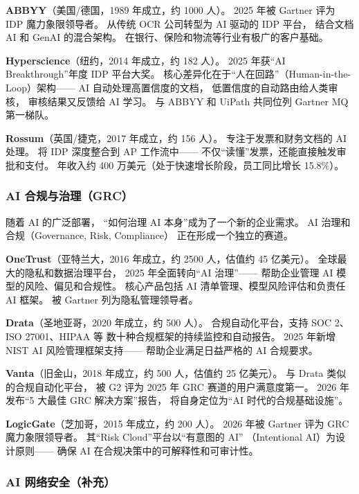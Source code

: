 \textbf{ABBYY}（美国/德国，1989 年成立，约 1000 人）。
2025 年被 Gartner 评为 IDP 魔力象限领导者。
从传统 OCR 公司转型为 AI 驱动的 IDP 平台，
结合文档 AI 和 GenAI 的混合架构。
在银行、保险和物流等行业有极广的客户基础。

\textbf{Hyperscience}（纽约，2014 年成立，约 182 人）。
2025 年获``AI Breakthrough''年度 IDP 平台大奖。
核心差异化在于``人在回路''（Human-in-the-Loop）架构——
AI 自动处理高置信度的文档，
低置信度的自动路由给人类审核，
审核结果又反馈给 AI 学习。
与 ABBYY 和 UiPath 共同位列 Gartner MQ 第一梯队。

\textbf{Rossum}（英国/捷克，2017 年成立，约 156 人）。
专注于发票和财务文档的 AI 处理。
将 IDP 深度整合到 AP 工作流中——
不仅``读懂''发票，还能直接触发审批和支付。
年收入约 400 万美元（处于快速增长阶段，员工同比增长 15.8\%）。

\subsubsection{AI 合规与治理（GRC）}

随着 AI 的广泛部署，
``如何治理 AI 本身''成为了一个新的企业需求。
AI 治理和合规（Governance, Risk, Compliance）
正在形成一个独立的赛道。

\textbf{OneTrust}（亚特兰大，2016 年成立，约 2500 人，估值约 45 亿美元）。
全球最大的隐私和数据治理平台，
2025 年全面转向``AI 治理''——
帮助企业管理 AI 模型的风险、偏见和合规性。
核心产品包括 AI 清单管理、模型风险评估和负责任 AI 框架。
被 Gartner 列为隐私管理领导者。

\textbf{Drata}（圣地亚哥，2020 年成立，约 500 人）。
合规自动化平台，支持 SOC 2、ISO 27001、HIPAA 等
数十种合规框架的持续监控和自动报告。
2025 年新增 NIST AI 风险管理框架支持——
帮助企业满足日益严格的 AI 合规要求。

\textbf{Vanta}（旧金山，2018 年成立，约 500 人，估值约 25 亿美元）。
与 Drata 类似的合规自动化平台，
被 G2 评为 2025 年 GRC 赛道的用户满意度第一。
2026 年发布``5 大最佳 GRC 解决方案''报告，
将自身定位为``AI 时代的合规基础设施''。

\textbf{LogicGate}（芝加哥，2015 年成立，约 200 人）。
2026 年被 Gartner 评为 GRC 魔力象限领导者。
其``Risk Cloud''平台以``有意图的 AI''
（Intentional AI）为设计原则——
确保 AI 在合规决策中的可解释性和可审计性。

\subsubsection{AI 网络安全（补充）}

